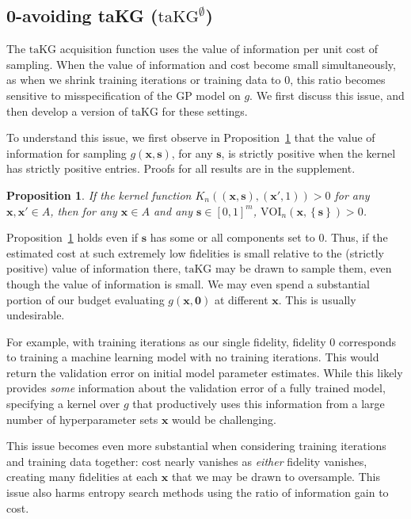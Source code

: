 \documentclass[letterpaper]{article}
\newcommand{\x}{\mathbf{x}}
\newcommand{\s}{\mathbf{s}}
\newcommand{\taKG}{\text{taKG}}
\newcommand{\taKGE}{\text{taKG}^\emptyset}
\newtheorem{proposition}{Proposition}
\numberwithin{equation}{section}
\begin{document}
\subsection{0-avoiding taKG ($\taKGE$)}
\label{sect:mvoi}
The $\taKG$ acquisition function uses the value of information per unit cost of sampling.  
When the value of information and cost become small simultaneously, as when we shrink training iterations or training data to 0, this ratio becomes sensitive to misspecification of the GP model on $g$. We first discuss this issue, and then develop a version of $\taKG$ for these settings.

To understand this issue, we first observe in Proposition~\ref{prop:positive} that the value of information for sampling $g(\x,\s)$, for any $\s$, is strictly positive when the kernel has strictly positive entries.
Proofs for all results are in the supplement.

\begin{proposition}
If the kernel function $K_n((\x, \s), (\x', 1)) > 0$ for any $\x, \x' \in A$, then for any $\x \in A$ and any $\s\in[0,1]^m$, $\text{VOI}_n(\x, \left\{ \s\right\}) > 0$.
\label{prop:positive}
\end{proposition}


Proposition~\ref{prop:positive} holds even if $\s$ has some or all components set to 0.
Thus, if the estimated cost at such extremely low fidelities is small relative to the (strictly positive) value of information there, $\taKG$ may be drawn to sample them, even though the value of information is small.  We may even spend a substantial portion of our budget evaluating $g(\x,\mathbf{0})$ at different $\x$.
This is usually undesirable.

For example, with training iterations as our single fidelity, 
fidelity $0$ corresponds to training a machine learning model with no training iterations.
This would return the validation error on initial model parameter estimates.
While this likely provides {\it some} information about the validation error of a fully trained model, 
specifying a kernel over $g$ that productively uses this information from a large number of hyperparameter sets $\x$ 
would be challenging.

This issue becomes even more substantial when considering training iterations
and training data together: cost nearly vanishes
as {\it either} fidelity vanishes, creating many
fidelities at each $\x$ that we may be drawn to oversample.
This issue also harms entropy search methods
\citep{klein2016fast,mcleod2017practical,klein-bayesopt17}
using the ratio of information gain to cost.
\end{document}
